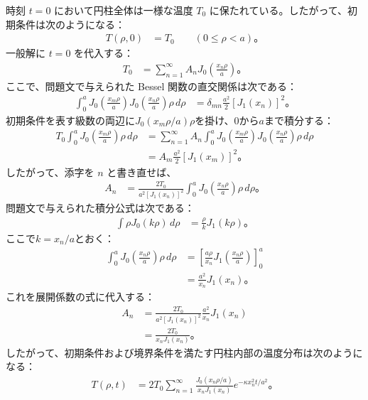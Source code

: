 \documentclass[platex,dvipdfmx,a4paper]{jsarticle}
\begin{document}
  時刻 $t=0$ において円柱全体は一様な温度 $T_0$ に保たれている。したがって、初期条件は次のようになる：
  \begin{align*}
    T(\rho,0)&=T_0\qquad (0\leq\rho<a)。
  \end{align*}
  一般解に $t=0$ を代入する：
  \begin{align*}
    T_0
    &=\sum_{n=1}^{\infty}
      A_nJ_0\left(\frac{x_n\rho}{a}\right)。
  \end{align*}
  ここで、問題文で与えられた Bessel 関数の直交関係は次である：
  \begin{align*}
    \int_0^a
    J_0\left(\frac{x_m\rho}{a}\right)
    J_0\left(\frac{x_n\rho}{a}\right)
    \rho\,d\rho
    &=\delta_{mn}\frac{a^2}{2}[J_1(x_n)]^2。
  \end{align*}
  初期条件を表す級数の両辺に$J_0(x_m\rho/a)\rho$を掛け、$0$から$a$まで積分する：
  \begin{align*}
    T_0\int_0^a
    J_0\left(\frac{x_m\rho}{a}\right)
    \rho\,d\rho
    &=\sum_{n=1}^{\infty}
      A_n\int_0^a
      J_0\left(\frac{x_m\rho}{a}\right)
      J_0\left(\frac{x_n\rho}{a}\right)
      \rho\,d\rho\\
    &=A_m\frac{a^2}{2}[J_1(x_m)]^2。
  \end{align*}
  したがって、添字を $n$ と書き直せば、
  \begin{align*}
    A_n
    &=\frac{2T_0}{a^2[J_1(x_n)]^2}
      \int_0^a
      J_0\left(\frac{x_n\rho}{a}\right)
      \rho\,d\rho。
  \end{align*}
  問題文で与えられた積分公式は次である：
  \begin{align*}
    \int \rho J_0(k\rho)\,d\rho
    &=\frac{\rho}{k}J_1(k\rho)。
  \end{align*}
  ここで$k=x_n/a$とおく：
  \begin{align*}
    \int_0^a
    J_0\left(\frac{x_n\rho}{a}\right)
    \rho\,d\rho
    &=\left[
      \frac{a\rho}{x_n}
      J_1\left(\frac{x_n\rho}{a}\right)
    \right]_0^a\\
    &=\frac{a^2}{x_n}J_1(x_n)。
  \end{align*}
  これを展開係数の式に代入する：
  \begin{align*}
    A_n
    &=\frac{2T_0}{a^2[J_1(x_n)]^2}
      \frac{a^2}{x_n}J_1(x_n)\\
    &=\frac{2T_0}{x_nJ_1(x_n)}。
  \end{align*}
  したがって、初期条件および境界条件を満たす円柱内部の温度分布は次のようになる：
  \begin{align*}
    T(\rho,t)
    &=2T_0\sum_{n=1}^{\infty}
      \frac{J_0(x_n\rho/a)}{x_nJ_1(x_n)}
      e^{-\kappa x_n^2t/a^2}。
  \end{align*}
  
\end{document}
